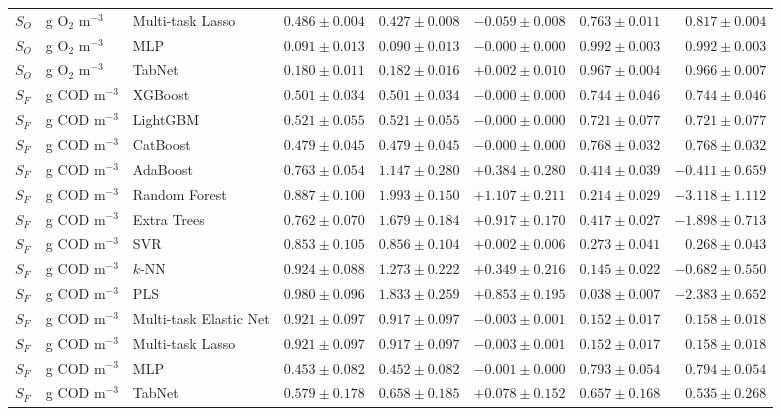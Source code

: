 \begin{longtable}{llp{3.1cm}rrrrr}
$S_{O}$ & g O$_2$ m$^{-3}$ & Multi-task Lasso & $0.486\pm0.004$ & $0.427\pm0.008$ & $-0.059\pm0.008$ & $0.763\pm0.011$ & $0.817\pm0.004$ \\
$S_{O}$ & g O$_2$ m$^{-3}$ & MLP & $0.091\pm0.013$ & $0.090\pm0.013$ & $-0.000\pm0.000$ & $0.992\pm0.003$ & $0.992\pm0.003$ \\
$S_{O}$ & g O$_2$ m$^{-3}$ & TabNet & $0.180\pm0.011$ & $0.182\pm0.016$ & $+0.002\pm0.010$ & $0.967\pm0.004$ & $0.966\pm0.007$ \\
$S_{F}$ & g COD m$^{-3}$ & XGBoost & $0.501\pm0.034$ & $0.501\pm0.034$ & $-0.000\pm0.000$ & $0.744\pm0.046$ & $0.744\pm0.046$ \\
$S_{F}$ & g COD m$^{-3}$ & LightGBM & $0.521\pm0.055$ & $0.521\pm0.055$ & $-0.000\pm0.000$ & $0.721\pm0.077$ & $0.721\pm0.077$ \\
$S_{F}$ & g COD m$^{-3}$ & CatBoost & $0.479\pm0.045$ & $0.479\pm0.045$ & $-0.000\pm0.000$ & $0.768\pm0.032$ & $0.768\pm0.032$ \\
$S_{F}$ & g COD m$^{-3}$ & AdaBoost & $0.763\pm0.054$ & $1.147\pm0.280$ & $+0.384\pm0.280$ & $0.414\pm0.039$ & $-0.411\pm0.659$ \\
$S_{F}$ & g COD m$^{-3}$ & Random Forest & $0.887\pm0.100$ & $1.993\pm0.150$ & $+1.107\pm0.211$ & $0.214\pm0.029$ & $-3.118\pm1.112$ \\
$S_{F}$ & g COD m$^{-3}$ & Extra Trees & $0.762\pm0.070$ & $1.679\pm0.184$ & $+0.917\pm0.170$ & $0.417\pm0.027$ & $-1.898\pm0.713$ \\
$S_{F}$ & g COD m$^{-3}$ & SVR & $0.853\pm0.105$ & $0.856\pm0.104$ & $+0.002\pm0.006$ & $0.273\pm0.041$ & $0.268\pm0.043$ \\
$S_{F}$ & g COD m$^{-3}$ & $k$-NN & $0.924\pm0.088$ & $1.273\pm0.222$ & $+0.349\pm0.216$ & $0.145\pm0.022$ & $-0.682\pm0.550$ \\
$S_{F}$ & g COD m$^{-3}$ & PLS & $0.980\pm0.096$ & $1.833\pm0.259$ & $+0.853\pm0.195$ & $0.038\pm0.007$ & $-2.383\pm0.652$ \\
$S_{F}$ & g COD m$^{-3}$ & Multi-task Elastic Net & $0.921\pm0.097$ & $0.917\pm0.097$ & $-0.003\pm0.001$ & $0.152\pm0.017$ & $0.158\pm0.018$ \\
$S_{F}$ & g COD m$^{-3}$ & Multi-task Lasso & $0.921\pm0.097$ & $0.917\pm0.097$ & $-0.003\pm0.001$ & $0.152\pm0.017$ & $0.158\pm0.018$ \\
$S_{F}$ & g COD m$^{-3}$ & MLP & $0.453\pm0.082$ & $0.452\pm0.082$ & $-0.001\pm0.000$ & $0.793\pm0.054$ & $0.794\pm0.054$ \\
$S_{F}$ & g COD m$^{-3}$ & TabNet & $0.579\pm0.178$ & $0.658\pm0.185$ & $+0.078\pm0.152$ & $0.657\pm0.168$ & $0.535\pm0.268$ \\

\end{longtable}

